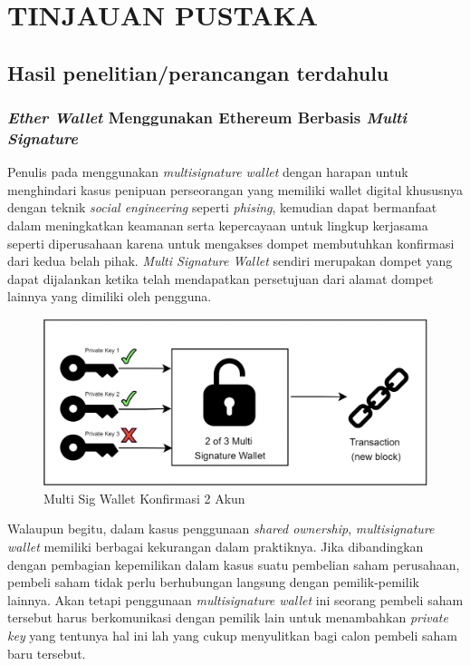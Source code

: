 \chapter{TINJAUAN PUSTAKA}

\section{Hasil penelitian/perancangan terdahulu}

\subsection{\emph{Ether Wallet} Menggunakan Ethereum Berbasis \emph{Multi Signature} }

Penulis pada \parencite{IdaBagus} menggunakan \emph{multisignature wallet} dengan harapan untuk menghindari kasus penipuan perseorangan yang memiliki wallet digital khususnya dengan teknik \emph{social engineering} seperti \emph{phising}, kemudian dapat bermanfaat dalam meningkatkan keamanan serta kepercayaan untuk lingkup kerjasama seperti diperusahaan karena untuk mengakses dompet membutuhkan konfirmasi dari kedua belah pihak. \emph{Multi Signature Wallet} sendiri merupakan dompet yang dapat dijalankan ketika telah mendapatkan persetujuan dari alamat dompet lainnya yang dimiliki oleh pengguna. 

\begin{figure} [ht] \centering
  \includegraphics[scale=0.6]{gambar/img-multisignature-wallet.png}
  \caption{Multi Sig Wallet Konfirmasi 2 Akun}
  \label{fig:Multisignature Wallet}
\end{figure}

Walaupun begitu, dalam kasus penggunaan \emph{shared ownership}, \emph{multisignature wallet} memiliki berbagai kekurangan dalam praktiknya. Jika dibandingkan dengan pembagian kepemilikan dalam kasus suatu pembelian saham perusahaan, pembeli saham tidak perlu berhubungan langsung dengan pemilik-pemilik lainnya. Akan tetapi penggunaan \emph{multisignature wallet} ini seorang pembeli saham tersebut harus berkomunikasi dengan pemilik lain untuk menambahkan \emph{private key} yang tentunya hal ini lah yang cukup menyulitkan bagi calon pembeli saham baru tersebut. 


